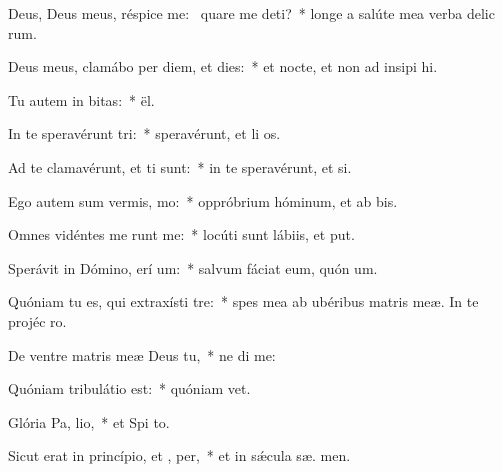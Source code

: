 \item Deus, Deus meus, réspice  me:~\pscross{} quare me deti?~* longe a salúte mea verba delic rum.
\item Deus meus, clamábo per diem, et  dies:~* et nocte, et non ad insipi hi.
\item Tu autem in  bitas:~*  ël.
\item In te speravérunt  tri:~* speravérunt, et li os.
\item Ad te clamavérunt, et  ti sunt:~* in te speravérunt, et   si.
\item Ego autem sum vermis,   mo:~* oppróbrium hóminum, et ab bis.
\item Omnes vidéntes me runt me:~* locúti sunt lábiis, et  put.
\item Sperávit in Dómino, erí um:~* salvum fáciat eum, quón  um.
\item Quóniam tu es, qui extraxísti   tre:~* spes mea ab ubéribus matris meæ. In te projéc   ro.
\item De ventre matris meæ Deus   tu,~* ne di  me:
\item Quóniam tribulátio  est:~* quóniam    vet.
\item Glória Pa,  lio,~* et Spi to.
\item Sicut erat in princípio, et ,  per,~* et in sǽcula sæ. men.
